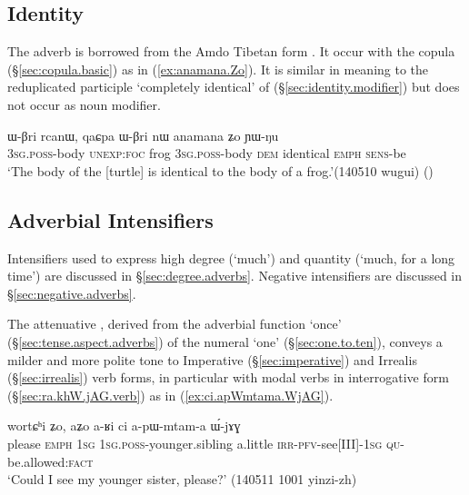 \subsection{Identity} \label{sec:identity.adverbs}
The adverb  is borrowed from the Amdo Tibetan form . It occur with the copula  (§\ref{sec:copula.basic}) as in (\ref{ex:anamana.Zo}). It is similar in meaning to the reduplicated participle  `completely identical' of  (§\ref{sec:identity.modifier}) but does not occur as noun modifier. 

\begin{exe}
\ex \label{ex:anamana.Zo}
 \gll ɯ-βri rcanɯ, qaɕpa ɯ-βri nɯ anamana ʑo ɲɯ-ŋu \\
 \textsc{3sg}.\textsc{poss}-body \textsc{unexp}:\textsc{foc} frog  \textsc{3sg}.\textsc{poss}-body \textsc{dem} identical \textsc{emph} \textsc{sens}-be \\
\glt `The body of the [turtle] is identical to the body of a frog.'(140510 wugui)
()
\end{exe}

\subsection{Adverbial Intensifiers} \label{sec:intensifier.adverbs}
Intensifiers used to express high degree (`much') and quantity (`much, for a long time') are discussed in §\ref{sec:degree.adverbs}. Negative intensifiers are discussed in §\ref{sec:negative.adverbs}.

The attenuative , derived from the adverbial function `once' (§\ref{sec:tense.aspect.adverbs}) of the numeral  `one' (§\ref{sec:one.to.ten}),  conveys a milder and more polite tone to Imperative (§\ref{sec:imperative}) and Irrealis (§\ref{sec:irrealis}) verb forms, in particular with modal verbs in interrogative form (§\ref{sec:ra.khW.jAG.verb}) as in (\ref{ex:ci.apWmtama.WjAG}).

 \begin{exe}
\ex \label{ex:ci.apWmtama.WjAG}
\gll wortɕʰi ʑo, aʑo a-ʁi ci a-pɯ-mtam-a ɯ́-jɤɣ \\
please \textsc{emph} \textsc{1sg} \textsc{1sg}.\textsc{poss}-younger.sibling a.little \textsc{irr}-\textsc{pfv}-see[III]-\textsc{1sg} \textsc{qu}-be.allowed:\textsc{fact} \\
\glt  `Could I see my younger sister, please?' (140511 1001 yinzi-zh)
 \end{exe} 
 
